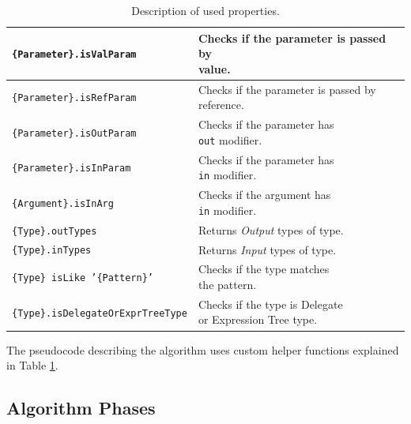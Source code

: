 \begin{table}[h]
\begin{center}
\begin{tabular}{ | l | l | } 
  \hline
  \texttt{\{Parameter\}.isValParam} & \makecell[lc]{Checks if the parameter is passed by\\ value.}\\ 
  \hline
  \texttt{\{Parameter\}.isRefParam} & \makecell[lc]{Checks if the parameter is passed by\\ reference.} \\ 
  \hline
  \texttt{\{Parameter\}.isOutParam} &\makecell[lc]{ Checks if the parameter has\\ \texttt{out} modifier.}\\ 
  \hline
  \texttt{\{Parameter\}.isInParam} & \makecell[lc]{Checks if the parameter has\\ \texttt{in} modifier.}\\ 
  \hline
  \texttt{\{Argument\}.isInArg} & \makecell[lc]{Checks if the argument has\\ \texttt{in} modifier.}\\ 
  \hline
  \texttt{\{Type\}.outTypes} & Returns \textit{Output} types of type.\\ 
  \hline
  \texttt{\{Type\}.inTypes} & Returns \textit{Input} types of type.\\ 
  \hline
  \texttt{\{Type\} isLike '\{Pattern\}'} & \makecell[lc]{Checks if the type matches\\ the pattern.}\\ 
  \hline
  \texttt{\{Type\}.isDelegateOrExprTreeType} & \makecell[lc]{Checks if the type is Delegate\\ or Expression Tree type.}\\ 
  \hline
\end{tabular}
\end{center}
\caption{Description of used properties.}
\label{table1:algorithmLegen}
\end{table}
\par
The pseudocode describing the algorithm uses custom helper functions explained in Table \ref{table1:algorithmLegen}.

\subsection{Algorithm Phases}

